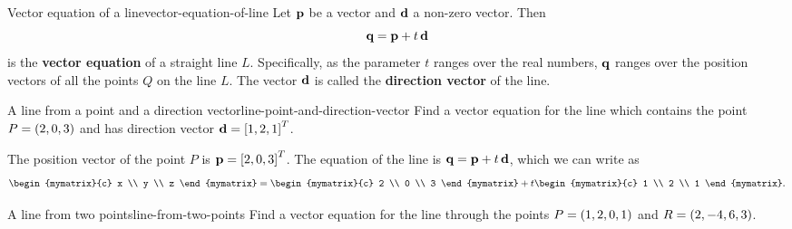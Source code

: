 \begin{definition}{Vector equation of a line}{vector-equation-of-line}
  Let $\mbox{\bf p}$ be a vector and $\mbox{\bf d}$ a non-zero vector. Then
  \begin{equation*}
    \mbox{\bf q} = \mbox{\bf p} + t\,\mbox{\bf d}
  \end{equation*}
  is the \textbf{vector equation}%
   of a
  straight line $L$. Specifically, as the parameter $t$ ranges over
  the real numbers, $\mbox{\bf q}$ ranges over the position vectors of all
  the points $Q$ on the line $L$.  The vector $\mbox{\bf d}$ is called the
  \textbf{direction vector}%
   of the line.
\end{definition} 

\begin{example}{A line from a point and a direction vector}{line-point-and-direction-vector}
  Find a vector equation for the line which contains the point
  $P = \left(2,0,3\right)$ and has direction vector
  $\mbox{\bf d} = \left[1,2,1\right]^T$.
\end{example}

\begin{solution}
  The position vector of the point $P$ is
  $\mbox{\bf p}=\left[2,0,3\right]^T$. The equation of the line is
  $\mbox{\bf q}= \mbox{\bf p} + t\,\mbox{\bf d}$, which we can write as
  \begin{equation*}
    \begin{mymatrix}{c} x \\ y \\ z \end{mymatrix}
    = \begin{mymatrix}{c} 2 \\ 0 \\ 3 \end{mymatrix}
    + t \begin{mymatrix}{c} 1 \\ 2 \\ 1 \end{mymatrix}.
  \end{equation*}
\end{solution}

\begin{example}{A line from two points}{line-from-two-points}
  Find a vector equation for the line through the points
  $P = \left(1,2,0,1\right)$ and $R = \left(2,-4,6,3\right)$.
\end{example}

